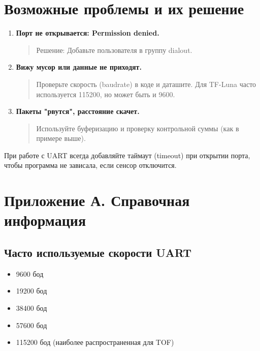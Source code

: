 \documentclass[12pt,a4paper]{article}
\begin{document}
\newpage
\section{Возможные проблемы и их решение}

\begin{enumerate}
    \item \textbf{Порт не открывается: Permission denied.}
        \begin{quote}
            Решение: Добавьте пользователя в группу dialout.
        \end{quote}
    
    \item \textbf{Вижу мусор или данные не приходят.}
        \begin{quote}
            Проверьте скорость (baudrate) в коде и даташите. Для TF-Luna часто используется 115200, но может быть и 9600.
        \end{quote}
    
    \item \textbf{Пакеты "рвутся", расстояние скачет.}
        \begin{quote}
            Используйте буферизацию и проверку контрольной суммы (как в примере выше).
        \end{quote}
\end{enumerate}

\begin{tcolorbox}[colback=yellow!5!white, colframe=yellow!75!black, title=Рекомендация]
При работе с UART всегда добавляйте таймаут (timeout) при открытии порта, чтобы программа не зависала, если сенсор отключится.
\end{tcolorbox}

\section{Приложение А. Справочная информация}

\subsection{Часто используемые скорости UART}
\begin{itemize}
    \item 9600 бод
    \item 19200 бод
    \item 38400 бод
    \item 57600 бод
    \item 115200 бод (наиболее распространенная для TOF)
\end{itemize}
\end{document}
